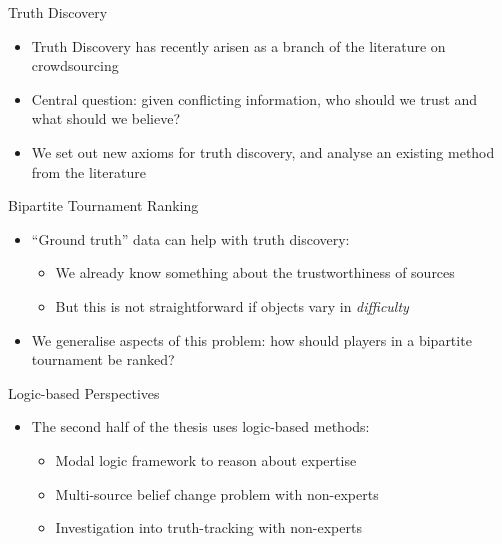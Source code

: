 \documentclass[10pt]{beamer}
\begin{document}
\begin{frame}{Truth Discovery}
    \begin{itemize}
        \item Truth Discovery has recently arisen as a branch of the literature
              on crowdsourcing
        \item Central question: given conflicting information, who should we
              trust and what should we believe?
        \item We set out new axioms for truth discovery, and analyse an
              existing method from the literature
    \end{itemize}

    \begin{figure}
        \centering
    \end{figure}

\end{frame}

\begin{frame}{Bipartite Tournament Ranking}
    \begin{itemize}
        \item ``Ground truth'' data can help with truth discovery:
        \begin{itemize}
            \item We already know something about the trustworthiness of
                  sources
            \item But this is not straightforward if objects vary in
                  \emph{difficulty}
        \end{itemize}
        \item We generalise aspects of this problem: how should players in a
              \alert{bipartite tournament} be ranked?
    \end{itemize}

\end{frame}

\begin{frame}{Logic-based Perspectives}
    \begin{itemize}
        \item The second half of the thesis uses logic-based methods:
        \begin{itemize}
            \item Modal logic framework to reason about expertise
            \item Multi-source belief change problem with non-experts
            \item Investigation into truth-tracking with non-experts
        \end{itemize}
    \end{itemize}
\end{frame}
\end{document}
